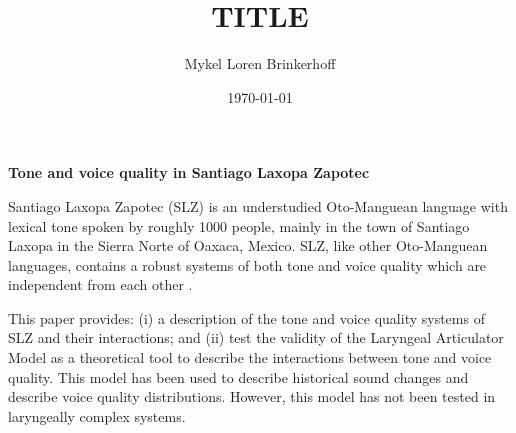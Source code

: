 \documentclass[12pt, letterpaper]{article}
\title{TITLE}
\author{Mykel Loren Brinkerhoff}
\date{\today}
\begin{document}
	

	
	
\begin{center}
	\textbf{Tone and voice quality in Santiago Laxopa Zapotec}
\end{center}
\thispagestyle{empty}

Santiago Laxopa Zapotec (SLZ) is an understudied Oto-Manguean language with lexical tone spoken by roughly 1000 people, mainly in the town of Santiago Laxopa in the Sierra Norte of Oaxaca, Mexico.
SLZ, like other Oto-Manguean languages, contains a robust systems of both tone and voice quality which are independent from each other \citep{silvermanLaryngealComplexityOtomanguean1997,blankenshipTimingNonmodalPhonation2002,avelinobecerraTopicsYalalagZapotec2004,arellanesSistemaFonologicoPropiedades2009}. 

This paper provides: (i) a description of the tone and voice quality systems of SLZ and their interactions; and (ii) test the validity of the Laryngeal Articulator Model \citep[LAM;][]{moisikMultimodalImagingGlottal2015,eslingVoiceQualityLaryngeal2019} as a theoretical tool to describe the interactions between tone and voice quality. This model has been used to describe historical sound changes and describe voice quality distributions. However, this model has not been tested in laryngeally complex systems. 
\end{document}
